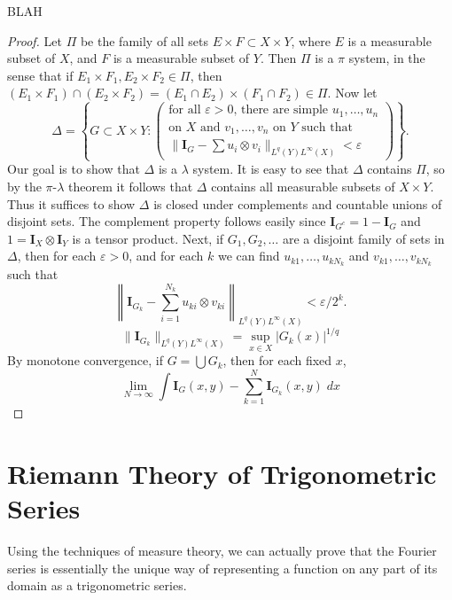 \begin{lemma}
  BLAH
\end{lemma}
\begin{proof}
  Let $\Pi$ be the family of all sets $E \times F \subset X \times Y$, where $E$ is a measurable subset of $X$, and $F$ is a measurable subset of $Y$. Then $\Pi$ is a $\pi$ system, in the sense that if $E_1 \times F_1, E_2 \times F_2 \in \Pi$, then $(E_1 \times F_1) \cap (E_2 \times F_2) = (E_1 \cap E_2) \times (F_1 \cap F_2) \in \Pi$. Now let
  \[ \Delta = \left\{ G \subset X \times Y: \left( \begin{array}{c} \text{for all $\varepsilon > 0$, there are simple $u_1, \dots, u_n$} \\ \text{on $X$ and $v_1,\dots, v_n$ on $Y$ such that} \\ \| \mathbf{I}_G - \sum u_i \otimes v_i \|_{L^q(Y) L^\infty(X)} < \varepsilon \end{array} \right) \right\}. \]
  Our goal is to show that $\Delta$ is a $\lambda$ system. It is easy to see that $\Delta$ contains $\Pi$, so by the $\pi$-$\lambda$ theorem it follows that $\Delta$ contains all measurable subsets of $X \times Y$. Thus it suffices to show $\Delta$ is closed under complements and countable unions of disjoint sets. The complement property follows easily since $\mathbf{I}_{G^c} = 1 - \mathbf{I}_G$ and $1 = \mathbf{I}_X \otimes \mathbf{I}_Y$ is a tensor product. Next, if $G_1, G_2, \dots$ are a disjoint family of sets in $\Delta$, then for each $\varepsilon > 0$, and for each $k$ we can find $u_{k1}, \dots, u_{kN_k}$ and $v_{k1}, \dots, v_{kN_k}$ such that
  \[ \left\| \mathbf{I}_{G_k} - \sum_{i = 1}^{N_k} u_{ki} \otimes v_{ki} \right\|_{L^q(Y) L^\infty(X)} < \varepsilon / 2^k. \]
  \[ \| \mathbf{I}_{G_k} \|_{L^q(Y) L^\infty(X)} = \sup_{x \in X} |G_k(x)|^{1/q} \]
  By monotone convergence, if $G = \bigcup G_k$, then for each fixed $x$,
  \[ \lim_{N \to \infty} \int \mathbf{I}_G(x,y) - \sum_{k = 1}^N \mathbf{I}_{G_k}(x,y)\; dx \]
\end{proof}










\chapter{Riemann Theory of Trigonometric Series}

Using the techniques of measure theory, we can actually prove that the Fourier series is essentially the unique way of representing a function on any part of its domain as a trigonometric series.


